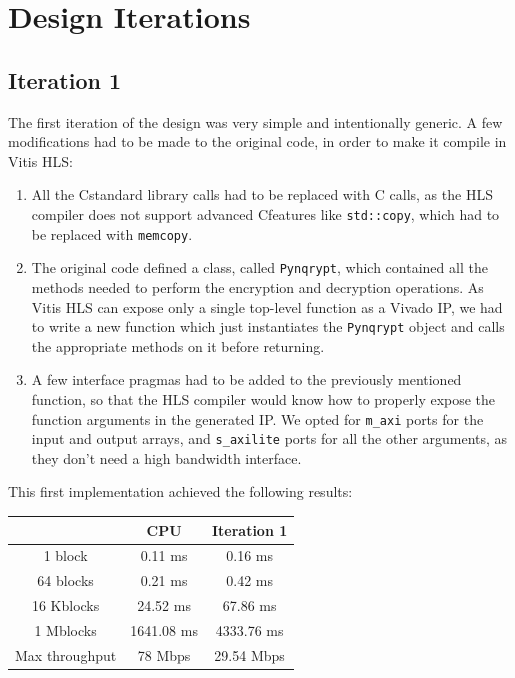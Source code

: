 \documentclass[12pt,oneside,a4paper]{article}
\def\CC{{C\nolinebreak[4]\hspace{-.05em}\raisebox{.4ex}{\tiny\bf ++}}}
\begin{document}
\section{Design Iterations} \label{sec:iterations}

\subsection{Iteration 1} \label{subsec:iter1}
The first iteration of the design was very simple and intentionally generic. A few modifications had to be made to the original code, in order to make it compile in Vitis HLS:
\begin{enumerate}
	\item All the \CC standard library calls had to be replaced with C calls, as the HLS compiler does not support advanced \CC features like \texttt{std::copy}, which had to be replaced with \texttt{memcopy}.
	\item The original code defined a class, called \texttt{Pynqrypt}, which contained all the methods needed to perform the encryption and decryption operations. As Vitis HLS can expose only a single top-level function as a Vivado IP, we had to write a new function which just instantiates the \texttt{Pynqrypt} object and calls the appropriate methods on it before returning.
	\item A few interface pragmas had to be added to the previously mentioned function, so that the HLS compiler would know how to properly expose the function arguments in the generated IP. We opted for \texttt{m\_axi} ports for the input and output arrays, and \texttt{s\_axilite} ports for all the other arguments, as they don't need a high bandwidth interface.
\end{enumerate}

This first implementation achieved the following results:
\begin{table}[h!]
	\centering
	\begin{tabular}{ccc}
		\toprule
		 & CPU & Iteration 1 \\
		\midrule
		1 block & 0.11 ms & 0.16 ms \\
		64 blocks & 0.21 ms & 0.42 ms \\
		16 Kblocks & 24.52 ms & 67.86 ms \\
		1 Mblocks & 1641.08 ms & 4333.76 ms \\
		Max throughput & 78 Mbps & 29.54 Mbps \\
		\bottomrule
	\end{tabular}
\end{table}
\end{document}
